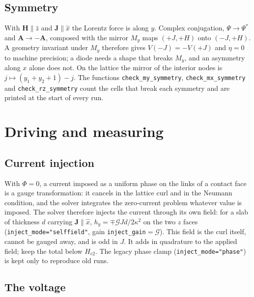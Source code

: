 \documentclass[11pt,a4paper]{article}
\newcommand{\Hc}[1]{H_{c#1}}
\newcommand{\code}[1]{\texttt{#1}}
\begin{document}
\subsection{Symmetry}

With $\mathbf H\parallel\hat z$ and $\mathbf J\parallel\hat x$ the Lorentz
force is along $y$. Complex conjugation, $\Psi\to\Psi^*$ and
$\mathbf A\to-\mathbf A$, composed with the mirror $M_y$ maps $(+J,+H)$ onto
$(-J,+H)$. A geometry invariant under $M_y$ therefore gives
$V(-J)=-V(+J)$ and $\eta=0$ to machine precision; a diode needs a shape that
breaks $M_y$, and an asymmetry along $x$ alone does not. On the lattice the
mirror of the interior nodes is $j\mapsto(y_1+y_2+1)-j$. The functions
\code{check\_my\_symmetry}, \code{check\_mx\_symmetry} and
\code{check\_rz\_symmetry} count the cells that break each symmetry and are
printed at the start of every run.

\section{Driving and measuring}

\subsection{Current injection}

With $\Phi=0$, a current imposed as a uniform phase on the links of a
contact face is a gauge transformation: it cancels in the lattice curl and
in the Neumann condition, and the solver integrates the zero-current
problem whatever value is imposed. The solver therefore injects the
current through its own field: for a slab of thickness $d$ carrying
$\mathbf J\parallel\hat x$, $h_y=\mp\mathcal G Jd/2\kappa^2$ on the two $z$
faces (\code{inject\_mode="selffield"}, gain \code{inject\_gain}$=\mathcal G$).
This field is the curl itself, cannot be gauged away, and is odd in $J$.
It adds in quadrature to the applied field; keep the total below $\Hc2$.
The legacy phase clamp (\code{inject\_mode="phase"}) is kept only to
reproduce old runs.

\subsection{The voltage}
\end{document}
